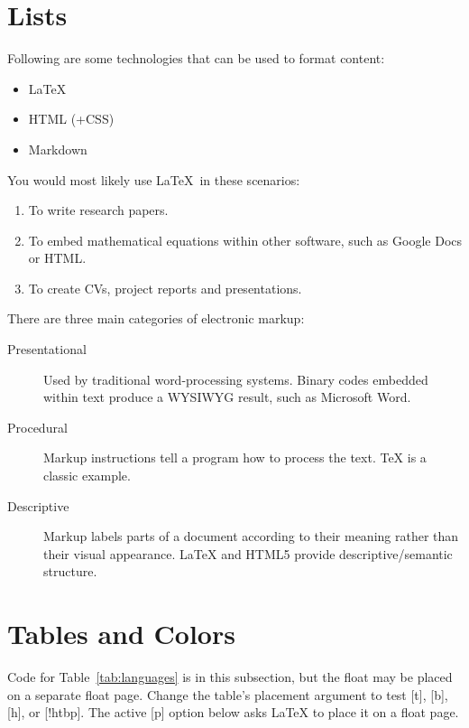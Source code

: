 \documentclass[12pt,a4paper]{article}
\begin{document}
\section{Lists}
Following are some technologies that can be used to format content:
\begin{itemize}
  \item \LaTeX
  \item HTML (+CSS)
  \item Markdown
\end{itemize}

You would most likely use \LaTeX\ in these scenarios:
\begin{enumerate}
  \item To write research papers.
  \item To embed mathematical equations within other software,
        such as Google Docs or HTML.
  \item To create CVs, project reports and presentations.
\end{enumerate}

There are three main categories of electronic markup:
\begin{description}
  \item[Presentational] Used by traditional word-processing systems.
  Binary codes embedded within text produce a WYSIWYG result,
  such as Microsoft Word.
  \item[Procedural] Markup instructions tell a program how to process
  the text. TeX is a classic example.
  \item[Descriptive] Markup labels parts of a document according to
  their meaning rather than their visual appearance. LaTeX and HTML5
  provide descriptive/semantic structure.
\end{description}

\section{Tables and Colors}
Code for Table~\ref{tab:languages} is in this subsection, but the float
may be placed on a separate float page. Change the table's placement
argument to test [t], [b], [h], or [!htbp]. The active [p] option below
asks LaTeX to place it on a float page.
\end{document}
